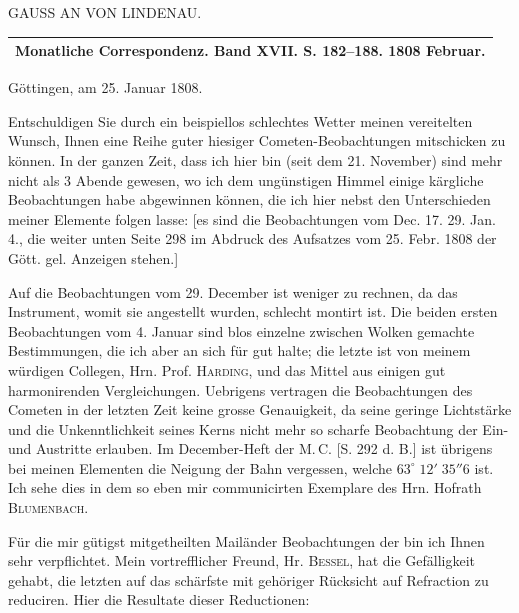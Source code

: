 \clearpage
{}
\hypertarget{native-301-lower}{}
\begin{center}GAUSS AN VON LINDENAU.
\end{center}

\begin{center}
\begin{tabular}{c}
\hline
Monatliche Correspondenz. Band XVII. S. 182--188. 1808 Februar.\\
\hline
\end{tabular}
\end{center}

\begin{flushright}
Göttingen, am 25. Januar 1808.
\end{flushright}

Entschuldigen Sie durch ein beispiellos schlechtes Wetter meinen vereitelten Wunsch, Ihnen
eine Reihe guter hiesiger Cometen-Beobachtungen mitschicken zu können. In der ganzen Zeit,
dass ich hier bin (seit dem 21. November) sind mehr nicht als 3 Abende gewesen, wo ich dem
ungünstigen Himmel einige kärgliche Beobachtungen habe abgewinnen können, die ich hier
nebst den Unterschieden meiner Elemente folgen lasse: [es sind die Beobachtungen vom
Dec. 17. 29. Jan. 4., die weiter unten Seite 298 im Abdruck des Aufsatzes vom 25. Febr.
1808 der Gött. gel. Anzeigen stehen.]

\par\indent Auf die Beobachtungen vom 29. December ist weniger zu rechnen, da das Instrument, womit
sie angestellt wurden, schlecht montirt ist. Die beiden ersten Beobachtungen vom 4. Januar
sind blos einzelne zwischen Wolken gemachte Bestimmungen, die ich aber an sich für gut
halte; die letzte ist von meinem würdigen Collegen, Hrn. Prof. \textsc{Harding}, und das Mittel aus
einigen gut harmonirenden Vergleichungen. Uebrigens vertragen die Beobachtungen des
Cometen in der letzten Zeit keine grosse Genauigkeit, da seine geringe Lichtstärke und die
Unkenntlichkeit seines Kerns nicht mehr so scharfe Beobachtung der Ein- und Austritte
erlauben. Im December-Heft der M.\,C. [S. 292 d. B.] ist übrigens bei meinen Elementen die
Neigung der Bahn vergessen, welche $63^\circ\;12'\;35''6$ ist. Ich sehe dies in dem so
eben mir communicirten Exemplare des Hrn. Hofrath \textsc{Blumenbach}.

\par\indent Für die mir gütigst mitgetheilten Mailänder Beobachtungen der \VestaAltarThreeOhOne{} bin ich Ihnen sehr verpflichtet. Mein vortrefflicher Freund, Hr. \textsc{Bessel}, hat die
Gefälligkeit gehabt, die letzten auf das schärfste mit gehöriger Rücksicht auf Refraction
zu reduciren. Hier die Resultate dieser Reductionen:


